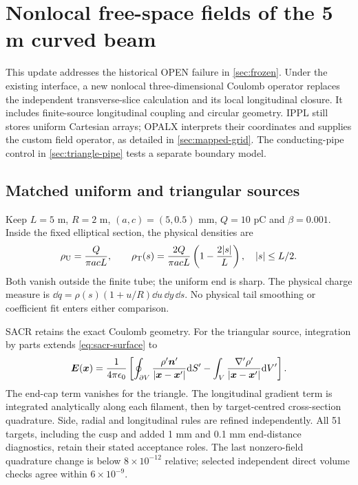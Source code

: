 \clearpage
\section{Nonlocal free-space fields of the 5 m curved beam}
\label{sec:free-open}
This update addresses the historical OPEN failure in \cref{sec:frozen}.
Under the existing  interface, a new nonlocal
three-dimensional Coulomb operator replaces the independent transverse-slice
calculation and its local longitudinal closure. It includes finite-source
longitudinal coupling and circular geometry. IPPL still stores uniform
Cartesian arrays; OPALX interprets their coordinates and supplies the custom
field operator, as detailed in \cref{sec:mapped-grid}. The conducting-pipe control in
\cref{sec:triangle-pipe} tests a separate boundary model.

\subsection{Matched uniform and triangular sources}
Keep $L=5$ m, $R=2$ m, $(a,c)=(5,0.5)$ mm, $Q=10$ pC and
$\beta=0.001$. Inside the fixed elliptical section, the physical densities are
\begin{equation}
 \rho_{\rm U}=\frac{Q}{\pi acL},\qquad
 \rho_{\rm T}(s)=\frac{2Q}{\pi acL}
 \left(1-\frac{2|s|}{L}\right),\quad |s|\le L/2.
 \label{eq:free-profiles}
\end{equation}
Both vanish outside the finite tube; the uniform end is sharp. The physical
charge measure is $\dd q=\rho(s)(1+u/R)\dd u\,\dd y\,\dd s$.
No physical tail smoothing or coefficient fit enters either comparison.

SACR retains the exact Coulomb geometry. For the triangular source, integration
by parts extends \cref{eq:sacr-surface} to
\begin{equation}
 \bm E(\bm x)=\frac{1}{4\pi\epsilon_0}
 \left[\oint_{\partial V}\frac{\rho'\bm n'}{|\bm x-\bm x'|}\mathrm d S'
 -\int_V\frac{\nabla'\rho'}{|\bm x-\bm x'|}\mathrm d V'\right].
 \label{eq:free-weighted-sacr}
\end{equation}
The end-cap term vanishes for the triangle. The longitudinal gradient term
is integrated analytically along each filament, then by target-centred
cross-section quadrature. Side, radial and longitudinal rules are refined
independently. All 51 targets, including the cusp and added 1 mm and 0.1 mm
end-distance diagnostics, retain their stated acceptance roles.
The last nonzero-field quadrature change is below $8\times10^{-12}$ relative;
selected independent direct volume checks agree within $6\times10^{-9}$.

